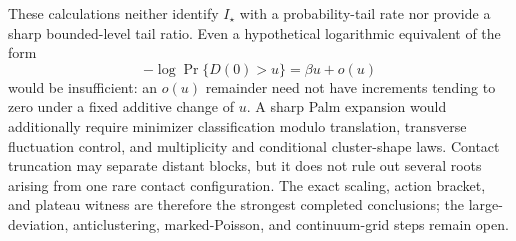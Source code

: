 These calculations neither identify \(I_\star\) with a probability-tail rate nor provide a sharp bounded-level tail ratio.  Even a hypothetical logarithmic equivalent of the form
\[
 -\log\Pr\{D(0)>u\}=\beta u+o(u)
\]
would be insufficient: an \(o(u)\) remainder need not have increments tending to zero under a fixed additive change of \(u\).  A sharp Palm expansion would additionally require minimizer classification modulo translation, transverse fluctuation control, and multiplicity and conditional cluster-shape laws.  Contact truncation may separate distant blocks, but it does not rule out several roots arising from one rare contact configuration.  The exact scaling, action bracket, and plateau witness are therefore the strongest completed conclusions; the large-deviation, anticlustering, marked-Poisson, and continuum-grid steps remain open.
